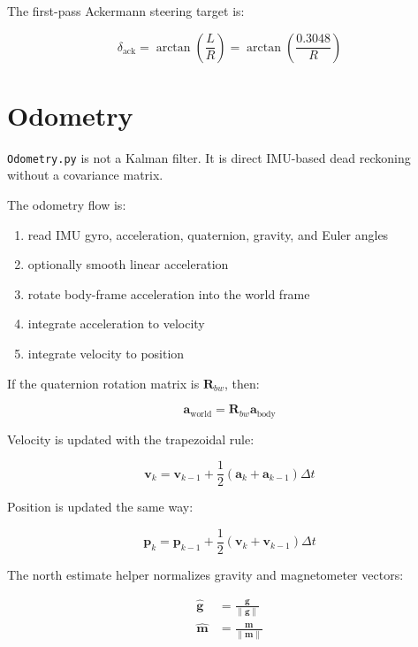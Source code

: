 \documentclass[11pt]{article}
\newcommand{\vect}[1]{\boldsymbol{#1}}
\newcommand{\mat}[1]{\mathbf{#1}}
\begin{document}
The first-pass Ackermann steering target is:

\begin{equation}
\delta_{\text{ack}} = \arctan\left(\frac{L}{R}\right) = \arctan\left(\frac{0.3048}{R}\right)
\end{equation}

\section{Odometry}

\texttt{Odometry.py} is not a Kalman filter. It is direct IMU-based dead reckoning without a covariance matrix.

The odometry flow is:

\begin{enumerate}
    \item read IMU gyro, acceleration, quaternion, gravity, and Euler angles
    \item optionally smooth linear acceleration
    \item rotate body-frame acceleration into the world frame
    \item integrate acceleration to velocity
    \item integrate velocity to position
\end{enumerate}

If the quaternion rotation matrix is $\mat{R}_{bw}$, then:

\begin{equation}
\vect{a}_{\text{world}} = \mat{R}_{bw}\vect{a}_{\text{body}}
\end{equation}

Velocity is updated with the trapezoidal rule:

\begin{equation}
\vect{v}_k = \vect{v}_{k-1} + \frac{1}{2}\left(\vect{a}_k + \vect{a}_{k-1}\right)\Delta t
\end{equation}

Position is updated the same way:

\begin{equation}
\vect{p}_k = \vect{p}_{k-1} + \frac{1}{2}\left(\vect{v}_k + \vect{v}_{k-1}\right)\Delta t
\end{equation}

The north estimate helper normalizes gravity and magnetometer vectors:

\begin{align}
\hat{\vect{g}} &= \frac{\vect{g}}{\|\vect{g}\|} \\
\hat{\vect{m}} &= \frac{\vect{m}}{\|\vect{m}\|}
\end{align}
\end{document}
